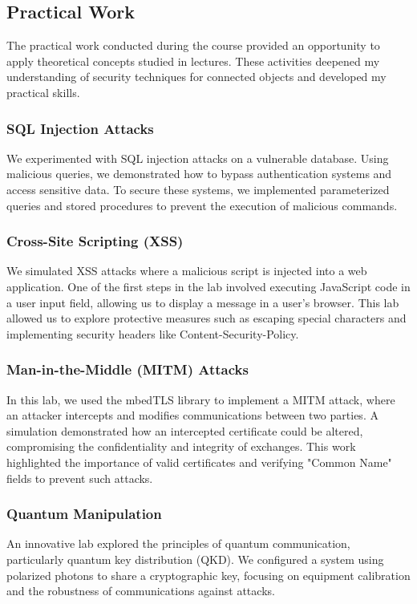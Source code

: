 \subsection{Practical Work}
\indent \indent The practical work conducted during the course provided an opportunity to apply theoretical concepts studied in lectures. These activities deepened my understanding of security techniques for connected objects and developed my practical skills.

\subsubsection{SQL Injection Attacks}
\indent \indent We experimented with SQL injection attacks on a vulnerable database. Using malicious queries, we demonstrated how to bypass authentication systems and access sensitive data. To secure these systems, we implemented parameterized queries and stored procedures to prevent the execution of malicious commands.

\subsubsection{Cross-Site Scripting (XSS)}
\indent \indent We simulated XSS attacks where a malicious script is injected into a web application. One of the first steps in the lab involved executing JavaScript code in a user input field, allowing us to display a message in a user's browser. This lab allowed us to explore protective measures such as escaping special characters and implementing security headers like Content-Security-Policy.

\subsubsection{Man-in-the-Middle (MITM) Attacks}
\indent \indent In this lab, we used the mbedTLS library to implement a MITM attack, where an attacker intercepts and modifies communications between two parties. A simulation demonstrated how an intercepted certificate could be altered, compromising the confidentiality and integrity of exchanges. This work highlighted the importance of valid certificates and verifying "Common Name" fields to prevent such attacks.

\subsubsection{Quantum Manipulation}
\indent \indent An innovative lab explored the principles of quantum communication, particularly quantum key distribution (QKD). We configured a system using polarized photons to share a cryptographic key, focusing on equipment calibration and the robustness of communications against attacks.

